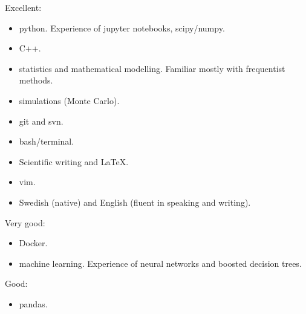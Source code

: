 



\begin{cvskills}



\cvskill
{Excellent:}
{\begin{itemize} \item python. Experience of jupyter notebooks, scipy/numpy.
						 \item C++.
						 \item statistics and mathematical modelling. Familiar mostly with frequentist methods.
						 \item simulations (Monte Carlo).
						 \item git and svn.
						 \item bash/terminal.
						 \item Scientific writing and LaTeX.
						 \item vim.
						 \item Swedish (native) and English (fluent in speaking and writing).
						  \end{itemize}} %

\cvskill
{Very good:}
{\begin{itemize} \item Docker.
						\item machine learning. Experience of neural networks and boosted decision trees.
						\end{itemize}} %

\cvskill
{Good:}
{\begin{itemize} \item pandas.
						\end{itemize}}





\end{cvskills}